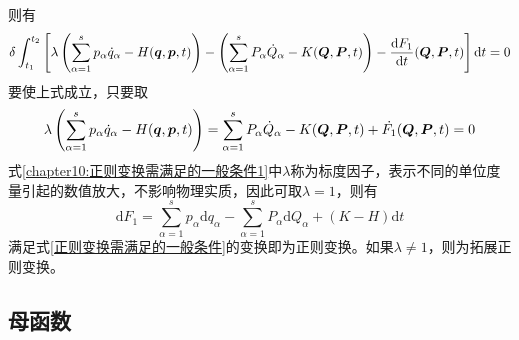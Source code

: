 则有
\begin{equation*}
	\delta \int_{t_1}^{t_2} \left[\lambda \left(\sum_{\alpha=1}^s p_\alpha \dot{q}_\alpha - H(\boldsymbol{q},\boldsymbol{p},t)\right) - \left(\sum_{\alpha=1}^s P_\alpha \dot{Q}_\alpha - K(\boldsymbol{Q},\boldsymbol{P},t)\right) - \frac{\mathrm{d} F_1}{\mathrm{d} t}(\boldsymbol{Q},\boldsymbol{P},t)\right] \mathrm{d} t = 0
\end{equation*}
要使上式成立，只要取
\begin{equation}
	\lambda \left(\sum_{\alpha=1}^s p_\alpha \dot{q}_\alpha - H(\boldsymbol{q},\boldsymbol{p},t)\right) = \sum_{\alpha=1}^s P_\alpha \dot{Q}_\alpha - K(\boldsymbol{Q},\boldsymbol{P},t) + \dot{F_1}(\boldsymbol{Q},\boldsymbol{P},t) = 0
	\label{chapter10:正则变换需满足的一般条件1}
\end{equation}
式\eqref{chapter10:正则变换需满足的一般条件1}中$\lambda$称为{\heiti 标度因子}，表示不同的单位度量引起的数值放大，不影响物理实质，因此可取$\lambda=1$，则有
\begin{equation}
	\mathrm{d} F_1 = \sum_{\alpha=1}^s p_\alpha \mathrm{d} q_\alpha - \sum_{\alpha=1}^s P_\alpha \mathrm{d} Q_\alpha + (K-H) \mathrm{d} t
	\label{正则变换需满足的一般条件}
\end{equation}
满足式\eqref{正则变换需满足的一般条件}的变换即为{\heiti 正则变换}。如果$\lambda \neq 1$，则为{\heiti 拓展正则变换}。

\subsection{母函数}


